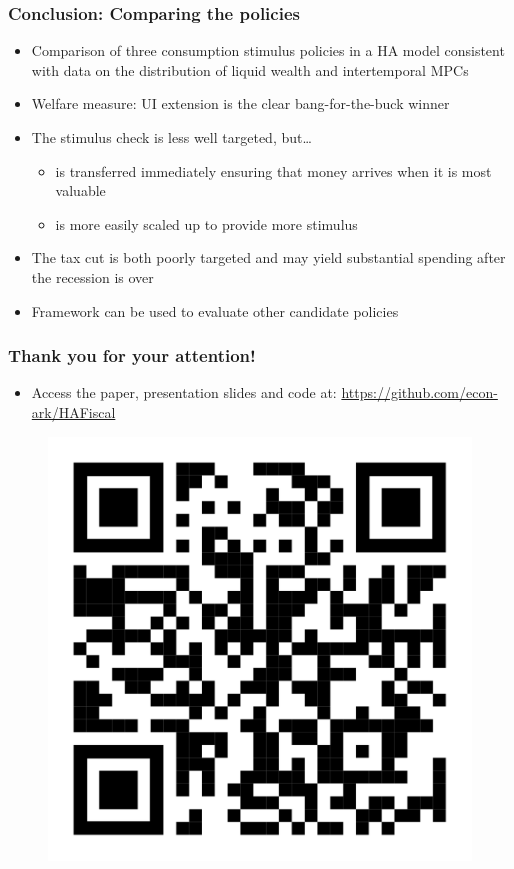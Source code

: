 \documentclass[pdflatex,aspectratio=169]{beamer}
\begin{document}
\begin{frame}
  \frametitle{Conclusion: Comparing the policies}
  \begin{itemize}[<+->]
    \itemsep = .5\bigskipamount
    \item
          Comparison of three consumption stimulus policies in a HA model consistent with data on the distribution of liquid wealth and intertemporal MPCs
    \item
          Welfare measure: UI extension is the clear bang-for-the-buck winner
    \item
          The stimulus check is less well targeted, but\ldots
          \begin{itemize}[<+->]
            \itemsep = .25\bigskipamount
            \item
                  is transferred immediately ensuring that money arrives when it is most valuable
            \item
                  is more easily scaled up to provide more stimulus
          \end{itemize}
    \item
          The tax cut is both poorly targeted and may yield substantial spending after the recession is over
    \item
          Framework can be used to evaluate other candidate policies

  \end{itemize}

\end{frame}

\begin{frame}
  \frametitle{Thank you for your attention!}
  \begin{itemize}[<+->]
    \item
          Access the paper, presentation slides and code at: \href{https://github.com/econ-ark/HAFiscal}{https://github.com/econ-ark/HAFiscal}
  \end{itemize}

  \begin{figure}
    \centering
    \includegraphics[width=0.3\linewidth]{@local/HAFiscal-Slides-qr-code}
  \end{figure}

\end{frame}
\end{document}
